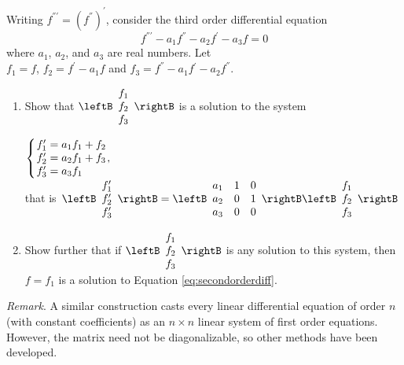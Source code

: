 \begin{multicols}{2}
\begin{ex}
\begin{sol}
\begin{enumerate}[label={\alph*.}]
\end{enumerate}
\end{sol}
\end{ex}

\begin{ex} \label{ex:3_5_7}
Writing $f^{\dprime\prime} = (f^\dprime)^{\prime}$, consider the third order differential equation
\begin{equation*}
f^{\dprime\prime} - a_1 f^{\dprime} - a_2 f^{\prime} - a_3 f = 0
\end{equation*}
where $a_{1}$, $a_{2}$, and $a_{3}$ are real numbers. Let \\ $f_{1} = f$, $f_{2} = f^{\prime}- a_{1}f$ and $f_{3} = f^\dprime - a_{1}f{}^{\prime} - a_{2}f^\dprime$.


\begin{enumerate}[label={\alph*.}]
\item Show that $\leftB \begin{array}{c}
f_1 \\
f_2 \\
f_3
\end{array}\rightB$
 is a solution to the system

$
\left\lbrace \arraycolsep=1pt
\begin{array}{l}
f_1^{\prime} = a_1f_1 + f_2 \\
f_2^{\prime} = a_2f_1 + f_3 \\
f_3^{\prime} = a_3f_1
\end{array}, \right.$  \\  that is  $ \left. \leftB \arraycolsep=5pt \begin{array}{c}
f_1^{\prime} \\
f_2^{\prime} \\
f_3^{\prime}
\end{array}\rightB = \leftB \arraycolsep=5pt \begin{array}{ccc}
a_1 & 1  & 0 \\
a_2 & 0 & 1 \\
a_3 & 0 & 0
\end{array}\rightB \leftB \arraycolsep=5pt \begin{array}{c}
f_1 \\
f_2 \\
f_3
\end{array}\rightB\right.$

\item Show further that if $\leftB \begin{array}{c}
f_1 \\
f_2 \\
f_3
\end{array}\rightB$
 is any solution to this system, then $f = f_{1}$ is a solution to Equation \ref{eq:secondorderdiff}. 
\end{enumerate}
\textit{Remark}. A similar construction casts every linear differential equation of order $n$ (with constant coefficients) as an $n \times n$ linear system of first order equations. However, the matrix need not be diagonalizable, so other methods have been developed.


\end{ex}

\end{multicols}
